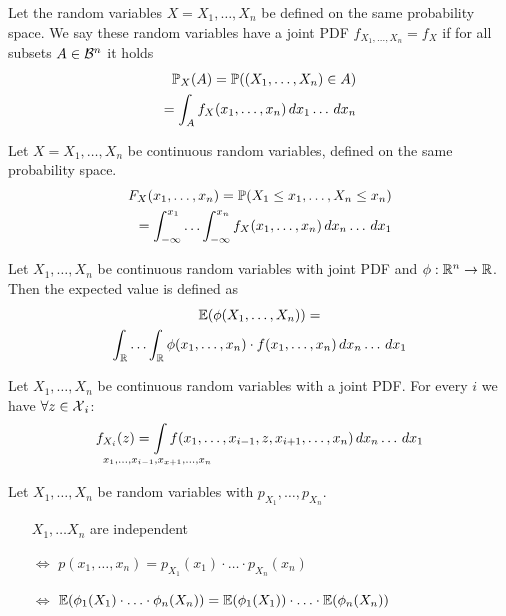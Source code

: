 \begin{cdefinition*}
  Let the random variables \(X = X_1, \ldots, X_n\) be defined on the same probability space. We say these random variables have a joint PDF \(f_{X_1, \ldots, X_n} = f_X\) if for all subsets \(A \in \B^n\) it holds
  \begin{align*}
    \P_X(A) = \P((X_1, \ldots, X_n) \in A) \\
    = \int_A f_X(x_1, \ldots, x_n) \, dx_1 \ldots \,dx_n
  \end{align*}
\end{cdefinition*}

\begin{cdefinition*}
  Let \(X = X_1, \ldots, X_n\) be continuous random variables, defined on the same probability space.
  \begin{align*}
    F_{X}(x_1, \ldots, x_n) = \P(X_1 \leq x_1, \ldots, X_n \leq x_n) \\
    = \int_{-\infty}^{x_1} \ldots \int_{-\infty}^{x_n} f_{X}(x_1, \ldots, x_n) \,dx_n \ldots \, dx_1
  \end{align*}
\end{cdefinition*}

\begin{proposition}
  Let \(X_1, \ldots, X_n\) be continuous random variables with joint PDF and \(\phi: \R^n \to \R\). Then the expected value is defined as
  \begin{multline*}
    \E(\phi(X_1, \ldots, X_n)) = \\ \int_\R \ldots \int_\R \phi(x_1, \ldots, x_n) \cdot f(x_1, \ldots, x_n) \, dx_n \ldots \, dx_1
  \end{multline*}
\end{proposition}

\begin{ctheorem*}
  Let \(X_1, \ldots, X_n\) be continuous random variables with a joint PDF. For every \(i\) we have \(\forall z \in \DX_i\):
  \[f_{X_i}(z) = \smashoperator{\int_{x_1, \ldots, x_{i-1}, x_{x+1}, \ldots, x_n}} f(x_1, \ldots, x_{i-1}, z, x_{i+1}, \ldots, x_n) \, dx_n \ldots \, dx_1\]
\end{ctheorem*}

\begin{theorem*}
  Let \(X_1, \ldots, X_n\) be random variables with \(p_{X_1}, \ldots, p_{X_n}\).
  \begin{itemize}
    \item[] \(X_1, \ldots X_n\) are independent
    \item[\(\Leftrightarrow\)] \(p(x_1, \ldots, x_n) = p_{X_1}(x_1) \cdot \ldots \cdot p_{X_n}(x_n)\)
    \item[\(\Leftrightarrow\)] \(\E(\phi_1(X_1) \cdot \ldots \cdot \phi_n(X_n)) = \E(\phi_1(X_1)) \cdot \ldots \cdot \E(\phi_n(X_n))\)
  \end{itemize}
\end{theorem*}

